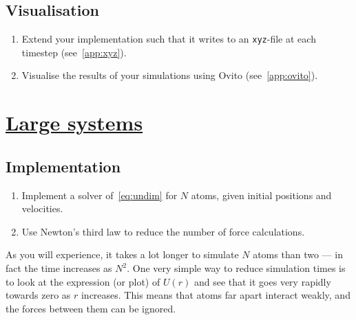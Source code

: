\documentclass[11pt,british,a4paper]{report}
\begin{document}

\subsection{Visualisation}
\begin{enumerate}[label=\roman*.]
    \item Extend your implementation such that it writes to an \texttt{xyz}-file at each timestep (see~\vref{app:xyz}).
    \item Visualise the results of your simulations using Ovito (see~\vref{app:ovito}).
\end{enumerate}

\section{\underline{Large systems}}

\subsection{Implementation}
\begin{enumerate}[label=\roman*.]
    \item Implement a solver of~\vref{eq:undim} for \(N\) atoms, given initial positions and velocities.
    \item Use Newton's third law to reduce the number of force calculations.
\end{enumerate}

As you will experience, it takes a lot longer to simulate \(N\) atoms than two --- in fact the time increases as \(N^2\). One very simple way to reduce simulation times is to look at the expression (or plot) of \(U(r)\) and see that it goes very rapidly towards zero as \(r\) increases. This means that atoms far apart interact weakly, and the forces between them can be ignored.
\end{document}
